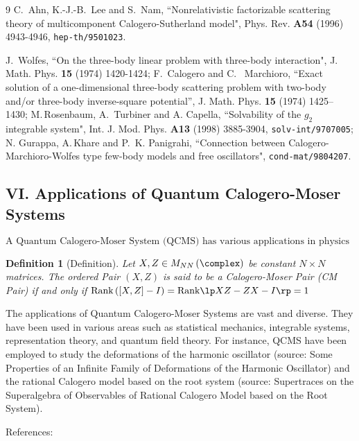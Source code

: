 \documentclass[12pt]{article}
\newtheorem{definition}[theorem]{Definition}
\begin{document}
{\begin{thebibliography}{9}
C.\, Ahn, K.-J.-B.\, Lee and S.\, Nam, ``Nonrelativistic factorizable
 scattering theory of multicomponent
Calogero-Sutherland model", Phys. Rev. {\bf A54} (1996) 4943-4946,
{\tt  hep-th/9501023}.

J.~Wolfes, ``On the three-body linear problem with three-body
interaction", J. Math. Phys. {\bf 15} (1974) 1420-1424;
F.~Calogero and C. ~Marchioro, ``Exact solution of a one-dimensional
three-body scattering problem with two-body and/or three-body
inverse-square potential'', J. Math. Phys. {\bf 15}
  (1974) 1425--1430;
M.\,Rosenbaum, A.\, Turbiner and A. Capella, ``Solvability of the $g_2$
integrable system", Int. J. Mod. Phys. {\bf A13} (1998) 3885-3904,
{\tt solv-int/9707005};
N. Gurappa, A.\,Khare and P.\, K. Panigrahi,
``Connection between Calogero-Marchioro-Wolfes type few-body models and
free oscillators", {\tt cond-mat/9804207}.
\end{thebibliography}

\subsection{VI. Applications of Quantum Calogero-Moser Systems}
 \begin{equation}
\text{A Quantum Calogero-Moser System (QCMS) has various applications in physics and mathematics.}
\end{equation}

\begin{definition}[Definition]
Let $X,Z \in M_{NN}\left( \complex \right)$ be constant $N\times N$ matrices. The ordered Pair $\left(X,Z \right)$ is said to be a Calogero-Moser Pair (CM Pair) if and only if $\text{Rank}\left( [X,Z] - I \right)=\text{Rank}\lp XZ-ZX-I \rp=1$
\end{definition}

The applications of Quantum Calogero-Moser Systems are vast and diverse. They have been used in various areas such as statistical mechanics, integrable systems, representation theory, and quantum field theory. For instance, QCMS have been employed to study the deformations of the harmonic oscillator (source: Some Properties of an Infinite Family of Deformations of the Harmonic Oscillator) and the rational Calogero model based on the root system (source: Supertraces on the Superalgebra of Observables of Rational Calogero Model based on the Root System).

References:
\begin{thebibliography}
SI>{z6iE&F`3nnѴ+(t
yH|*@LP1UP
jaX+[b#>փΆdA|AftWIAIlB
\end{thebibliography}                                                                                                                                                                                                              
                
}
\end{document}
